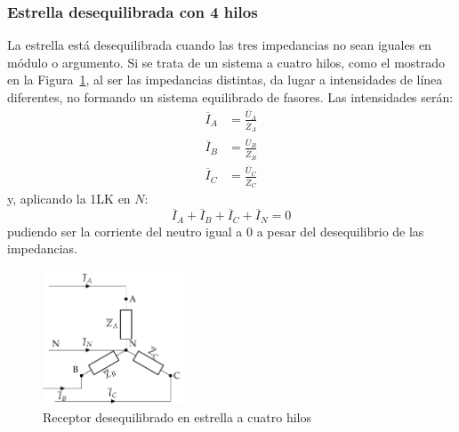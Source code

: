 	\subsubsection{Estrella desequilibrada con 4 hilos}
	\label{ref:estrella-des-4h}
	La estrella está desequilibrada cuando las tres impedancias no
        sean iguales en módulo o argumento. Si se trata de un sistema
        a cuatro hilos, como el mostrado en la
        Figura~\ref{fig.estrelladeseqiulibrado_4hilos}, al ser las
        impedancias distintas, da lugar a intensidades de línea
        diferentes, no formando un sistema equilibrado de fasores. Las
        intensidades serán:
	\begin{align*}
          \overline{I}_A &= \frac{\overline{U}_A}{\overline{Z}_A}\\
          \overline{I}_B &= \frac{\overline{U}_B}{\overline{Z}_B}\\
          \overline{I}_C &= \frac{\overline{U}_C}{\overline{Z}_C}
        \end{align*}
        y, aplicando la 1LK en $N$:
        \begin{equation}
          \overline{I}_A  + \overline{I}_B + \overline{I}_C + \overline{I}_N = 0
        \end{equation}
	pudiendo ser la corriente del neutro igual a 0 a pesar del
        desequilibrio de las impedancias.
	
	\begin{figure}[H]
          \centering
          \includegraphics[height=4cm]{../figs/EstrellaDesequilibrado_Receptor.pdf}
          \caption{Receptor desequilibrado en estrella a cuatro hilos}
          \label{fig.estrelladeseqiulibrado_4hilos}
	\end{figure}
	
